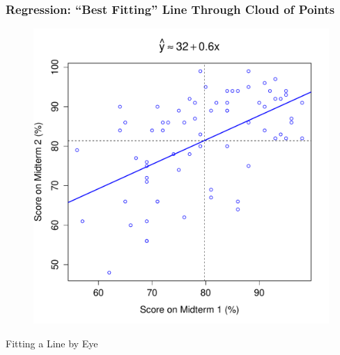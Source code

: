 \documentclass[handout]{beamer}
\begin{document}
\begin{frame}
\frametitle{Regression: ``Best Fitting'' Line Through Cloud of Points}
\begin{figure}
	\includegraphics[scale = 0.48]{./images/midterms5}
\end{figure}
\end{frame}

\begin{frame}

\centering \Huge Fitting a Line by Eye


\end{frame}






\end{document}
